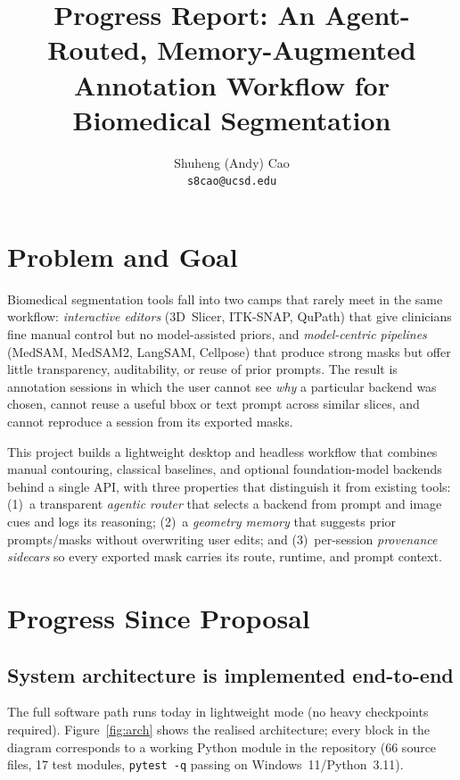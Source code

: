 \documentclass[10pt,letterpaper,twocolumn]{article}
\title{\vspace{-1.5em}Progress Report: An Agent-Routed, Memory-Augmented\\
Annotation Workflow for Biomedical Segmentation}
\author{Shuheng (Andy) Cao \\ \small{\texttt{s8cao@ucsd.edu}}}
\date{}
\begin{document}
\maketitle
\vspace{-1.8em}

\section{Problem and Goal}
Biomedical segmentation tools fall into two camps that rarely meet in
the same workflow: \emph{interactive editors} (3D~Slicer, ITK-SNAP,
QuPath) that give clinicians fine manual control but no model-assisted
priors, and \emph{model-centric pipelines} (MedSAM, MedSAM2, LangSAM,
Cellpose) that produce strong masks but offer little transparency,
auditability, or reuse of prior prompts. The result is annotation
sessions in which the user cannot see \emph{why} a particular backend
was chosen, cannot reuse a useful bbox or text prompt across similar
slices, and cannot reproduce a session from its exported masks.

This project builds a lightweight desktop and headless workflow that
combines manual contouring, classical baselines, and optional
foundation-model backends behind a single API, with three properties
that distinguish it from existing tools: (1)~a transparent
\emph{agentic router} that selects a backend from prompt and image
cues and logs its reasoning; (2)~a \emph{geometry memory} that
suggests prior prompts/masks without overwriting user edits; and
(3)~per-session \emph{provenance sidecars} so every exported mask
carries its route, runtime, and prompt context.

\section{Progress Since Proposal}

\subsection{System architecture is implemented end-to-end}

The full software path runs today in lightweight mode (no heavy
checkpoints required). Figure~\ref{fig:arch} shows the realised
architecture; every block in the diagram corresponds to a working
Python module in the repository (66 source files, 17 test modules,
\texttt{pytest -q} passing on Windows~11/Python~3.11).
\end{document}
